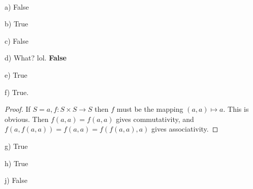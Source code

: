 \documentclass[11pt]{amsart}
\begin{document}
\medskip {}\ 

a) False

b) True

c) False

d) What? lol. \textbf{False}

e) True

f) True.
\begin{proof}
	If $S = {a}, f: S \times S \to S$ then $f$ must be the mapping $(a,a) \mapsto a$. This is obvious. Then $f(a,a) = f(a,a)$ gives commutativity, and $f(a,f(a,a)) = f(a,a) = f(f(a,a),a)$ gives associativity.
\end{proof}

g) True
 
h) True

j) False
\end{document}
